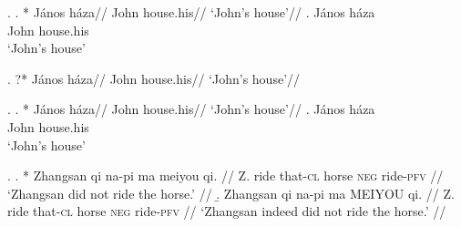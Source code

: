 \documentclass[12pt,letterpaper]{article}
\begin{document}

\ex.
\a. *
	\begingl
    \gla J\'anos h\'aza//
    \glb John house.his//
    \glft `John's house'//
    \endgl
\bg. János háza\\
     John house.his\\
    `John's house'
     
\ex. ?*
	\begingl
    \gla{}J\'anos h\'aza//
    \glb John house.his//
    \glft `John's house'//
    \endgl

\ex.
\a. *
	\begingl
    \gla J\'anos h\'aza//
    \glb John house.his//
    \glft `John's house'//
    \endgl
\bg. János háza\\
     John house.his\\
      `John's house'

\ex. 
\a. *
\begingl
\gla Zhangsan qi na-pi ma  meiyou qi. //
\glb Z. ride that-\textsc{cl} horse  \textsc{neg} ride-\textsc{pfv}  //
\glft `Zhangsan did not ride the horse.' //
\endgl
\b. 
\begingl
\gla Zhangsan qi na-pi ma  MEIYOU qi. //
\glb Z. ride that-\textsc{cl} horse  \textsc{neg} ride-\textsc{pfv}  //
\glft `Zhangsan indeed did not ride the horse.' //
\endgl
\end{document}
